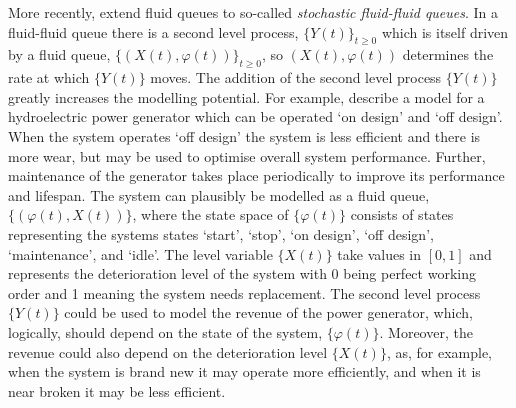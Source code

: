 
More recently, \cite{bo2014} extend fluid queues to so-called \emph{stochastic fluid-fluid queues}. In a fluid-fluid queue there is a second level process, \(\{Y(t)\}_{t\geq0}\) which is itself driven by a fluid queue, \(\{(X(t),\varphi(t))\}_{t\geq0}\), so \((X(t),\varphi(t))\) determines the rate at which \(\{Y(t)\}\) moves. The addition of the second level process \(\{Y(t)\}\) greatly increases the modelling potential. For example, \cite{hydro,bo2014} describe a model for a hydroelectric power generator which can be operated `on design' and `off design'. When the system operates `off design' the system is less efficient and there is more wear, but may be used to optimise overall system performance. Further, maintenance of the generator takes place periodically to improve its performance and lifespan. The system can plausibly be modelled as a fluid queue, \(\{(\varphi(t),X(t))\}\), where the state space of \(\{\varphi(t)\}\) consists of states representing the systems states `start', `stop', `on design', `off design', `maintenance', and `idle'. The level variable \(\{X(t)\}\) take values in \([0,1]\) and represents the deterioration level of the system with 0 being perfect working order and 1 meaning the system needs replacement. The second level process \(\{Y(t)\}\) could be used to model the revenue of the power generator, which, logically, should depend on the state of the system, \(\{\varphi(t)\}\). Moreover, the revenue could also depend on the deterioration level \(\{X(t)\}\), as, for example, when the system is brand new it may operate more efficiently, and when it is near broken it may be less efficient. 

